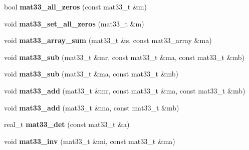 \begin{DoxyCompactItemize}
\item 
bool {\bfseries mat33\+\_\+all\+\_\+zeros} (const mat33\+\_\+t \&m)\hypertarget{namespacekukadu_a5163f5f45cac3e370200cce4504f8cf8}{}\label{namespacekukadu_a5163f5f45cac3e370200cce4504f8cf8}

\item 
void {\bfseries mat33\+\_\+set\+\_\+all\+\_\+zeros} (mat33\+\_\+t \&m)\hypertarget{namespacekukadu_a197d47c8ddf6eecf368658441b9190a9}{}\label{namespacekukadu_a197d47c8ddf6eecf368658441b9190a9}

\item 
void {\bfseries mat33\+\_\+array\+\_\+sum} (mat33\+\_\+t \&s, const mat33\+\_\+array \&ma)\hypertarget{namespacekukadu_affb9ae646afb6f7885e1b269ac85b6e9}{}\label{namespacekukadu_affb9ae646afb6f7885e1b269ac85b6e9}

\item 
void {\bfseries mat33\+\_\+sub} (mat33\+\_\+t \&mr, const mat33\+\_\+t \&ma, const mat33\+\_\+t \&mb)\hypertarget{namespacekukadu_a278e6db4d4f3f3bab2dda95aba405706}{}\label{namespacekukadu_a278e6db4d4f3f3bab2dda95aba405706}

\item 
void {\bfseries mat33\+\_\+sub} (mat33\+\_\+t \&ma, const mat33\+\_\+t \&mb)\hypertarget{namespacekukadu_abcb7388a14fdce19458c0787d2357b6a}{}\label{namespacekukadu_abcb7388a14fdce19458c0787d2357b6a}

\item 
void {\bfseries mat33\+\_\+add} (mat33\+\_\+t \&mr, const mat33\+\_\+t \&ma, const mat33\+\_\+t \&mb)\hypertarget{namespacekukadu_ac7c6f0954bd46d4d1977b4ea8463202c}{}\label{namespacekukadu_ac7c6f0954bd46d4d1977b4ea8463202c}

\item 
void {\bfseries mat33\+\_\+add} (mat33\+\_\+t \&ma, const mat33\+\_\+t \&mb)\hypertarget{namespacekukadu_a098745d0612399321b9c2d390b1f3ead}{}\label{namespacekukadu_a098745d0612399321b9c2d390b1f3ead}

\item 
real\+\_\+t {\bfseries mat33\+\_\+det} (const mat33\+\_\+t \&a)\hypertarget{namespacekukadu_a8d45ff573999bf63da68fe88ef7eecdf}{}\label{namespacekukadu_a8d45ff573999bf63da68fe88ef7eecdf}

\item 
void {\bfseries mat33\+\_\+inv} (mat33\+\_\+t \&mi, const mat33\+\_\+t \&ma)\hypertarget{namespacekukadu_af1f01fe4593d4e9912ffb878e3c8b017}{}\label{namespacekukadu_af1f01fe4593d4e9912ffb878e3c8b017}


\end{DoxyCompactItemize}
